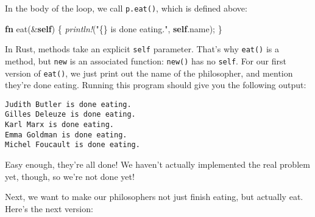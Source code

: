 \documentclass[a4paper,]{book}
\newenvironment{Shaded}{\begin{snugshade}}{\end{snugshade}}
\newcommand{\KeywordTok}[1]{\textcolor[rgb]{0.13,0.29,0.53}{\textbf{{#1}}}}
\newcommand{\StringTok}[1]{\textcolor[rgb]{0.31,0.60,0.02}{{#1}}}
\newcommand{\PreprocessorTok}[1]{\textcolor[rgb]{0.56,0.35,0.01}{\textit{{#1}}}}
\newcommand{\NormalTok}[1]{{#1}}
\begin{document}
In the body of the loop, we call \texttt{p.eat()}, which is defined
above:

\begin{Shaded}
\begin{Highlighting}[]
\KeywordTok{fn} \NormalTok{eat(&}\KeywordTok{self}\NormalTok{) \{}
    \PreprocessorTok{println!}\NormalTok{(}\StringTok{"\{\} is done eating."}\NormalTok{, }\KeywordTok{self}\NormalTok{.name);}
\NormalTok{\}}
\end{Highlighting}
\end{Shaded}

In Rust, methods take an explicit \texttt{self} parameter. That's why
\texttt{eat()} is a method, but \texttt{new} is an associated function:
\texttt{new()} has no \texttt{self}. For our first version of
\texttt{eat()}, we just print out the name of the philosopher, and
mention they're done eating. Running this program should give you the
following output:

\begin{verbatim}
Judith Butler is done eating.
Gilles Deleuze is done eating.
Karl Marx is done eating.
Emma Goldman is done eating.
Michel Foucault is done eating.
\end{verbatim}

Easy enough, they're all done! We haven't actually implemented the real
problem yet, though, so we're not done yet!

Next, we want to make our philosophers not just finish eating, but
actually eat. Here's the next version:
\end{document}
